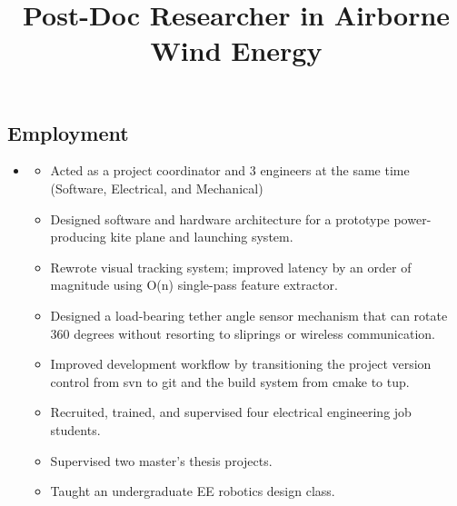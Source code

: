 \documentclass[line,lm,rm,11pt]{res} %
\def\spaceline{\vspace{1mm} \fullline}
\begin{document}
\begin{resume}
\section{Employment}
\begin{itemize}
\item
	\spaceline
	\title{\bf Post-Doc Researcher in Airborne Wind Energy }
	\begin{position}
	\vspace{-2mm}
	\begin{itemize}
		\item Acted as a project coordinator and 3 engineers at the same time (Software, Electrical, and Mechanical)
		\item Designed software and hardware architecture for a prototype power-producing kite plane and launching system.
		\item Rewrote visual tracking system; improved latency by an order of magnitude using O(n) single-pass feature extractor.
		\item Designed a load-bearing tether angle sensor mechanism that can rotate 360 degrees without resorting to sliprings or wireless communication.
		\item Improved development workflow by transitioning the project version control from svn to git and the build system from cmake to tup.
		\item Recruited, trained, and supervised four electrical engineering job students.
		\item Supervised two master's thesis projects.
		\item Taught an undergraduate EE robotics design class.


\end{itemize}
\end{position}
\end{itemize}
\end{resume}
\end{document}
